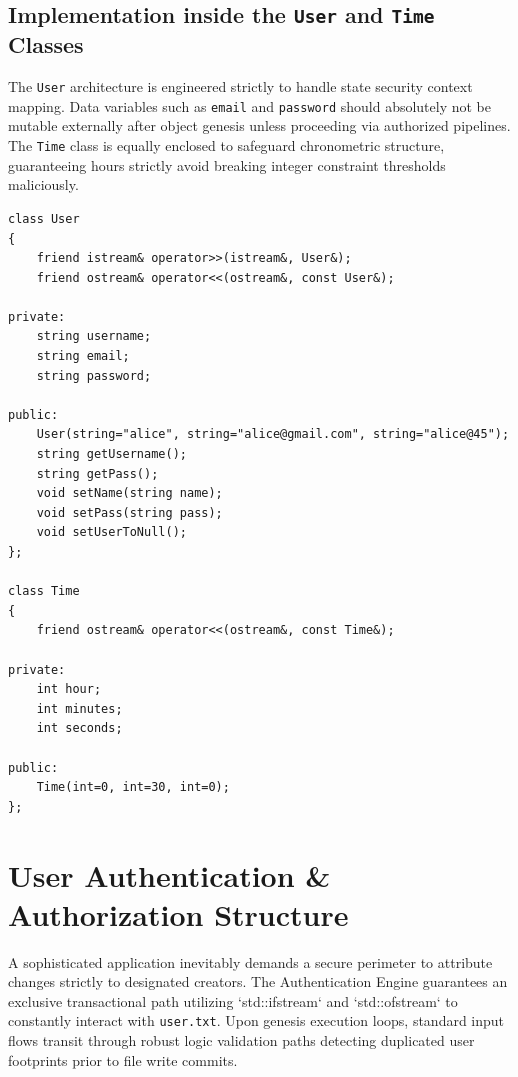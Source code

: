 \documentclass[12pt, a4paper]{article}
\begin{document}
\subsection{Implementation inside the \texttt{User} and \texttt{Time} Classes}
The \texttt{User} architecture is engineered strictly to handle state security context mapping. Data variables such as \texttt{email} and \texttt{password} should absolutely not be mutable externally after object genesis unless proceeding via authorized pipelines. The \texttt{Time} class is equally enclosed to safeguard chronometric structure, guaranteeing hours strictly avoid breaking integer constraint thresholds maliciously.

\begin{lstlisting}[caption={User.h and Time.h - Security and Temporal Abstract Scoping}]
class User
{
    friend istream& operator>>(istream&, User&);
    friend ostream& operator<<(ostream&, const User&);
    
private:
    string username;
    string email;
    string password;

public:
    User(string="alice", string="alice@gmail.com", string="alice@45");
    string getUsername();
    string getPass();
    void setName(string name);
    void setPass(string pass);
    void setUserToNull();
};

class Time
{
    friend ostream& operator<<(ostream&, const Time&);

private:
    int hour;
    int minutes;
    int seconds;

public:
    Time(int=0, int=30, int=0);
};
\end{lstlisting}

\newpage

\section{User Authentication \& Authorization Structure}

A sophisticated application inevitably demands a secure perimeter to attribute changes strictly to designated creators. The Authentication Engine guarantees an exclusive transactional path utilizing `std::ifstream` and `std::ofstream` to constantly interact with \texttt{user.txt}. Upon genesis execution loops, standard input flows transit through robust logic validation paths detecting duplicated user footprints prior to file write commits.
\end{document}
